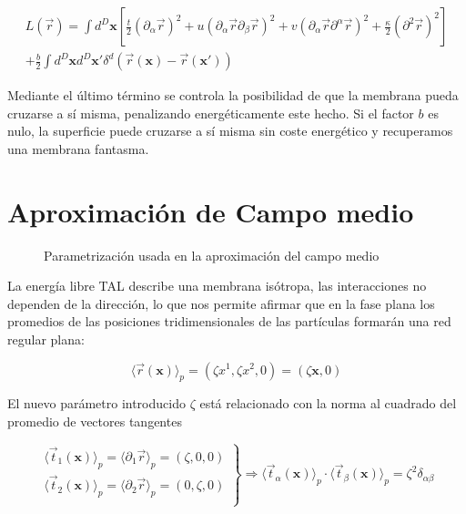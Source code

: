 \begin{multline}
L(\vec{r})=\int d^D\mathbf{x}
\left[
\frac{t}{2}(\partial_{\alpha}\vec{r})^2+
u(\partial_{\alpha}\vec{r}\partial_{\beta}\vec{r})^2+
v(\partial_{\alpha}\vec{r}\partial^{\alpha}\vec{r})^2+
\frac{\kappa}{2}(\partial^2\vec{r})^2
\right]\\
+\frac{b}{2}\int d^D\mathbf{x} d^D\mathbf{x'}
\delta^{d}(\vec{r}(\mathbf{x})-\vec{r}(\mathbf{x'}))
\end{multline}

Mediante el último término se controla la posibilidad de que la membrana pueda
cruzarse a sí misma, penalizando energéticamente este hecho. Si el factor $b$
es nulo, la superficie puede cruzarse a sí misma sin coste energético y
recuperamos una membrana fantasma.

\section{Aproximación de Campo medio}

\begin{figure}[h]
\centering
 \resizebox{\columnwidth}{!}{}
\caption{Parametrización usada en la aproximación del campo medio}
\end{figure}

La energía libre TAL  describe una membrana isótropa, las interacciones no
dependen de la dirección, lo que nos permite afirmar que en la fase
plana los promedios de las posiciones tridimensionales de las partículas
formarán una red regular plana:  

\begin{equation*}
 \langle\vec{r}(\mathbf{x})\rangle_{p}=(\zeta x^1,\zeta x^2,0)=(\zeta \mathbf{x},0) 
\end{equation*}

El nuevo parámetro introducido $\zeta$ está relacionado con la norma al
cuadrado del promedio de  vectores tangentes

\begin{equation*}
 \left.\begin{array}{c}
\langle\vec{t}_{1}(\mathbf{x})\rangle_{p}=\langle\partial_1\vec{r}\rangle_{p}=(\zeta ,0,0)\\
\langle\vec{t}_{2}(\mathbf{x})\rangle_{p}=\langle\partial_2\vec{r}\rangle_{p}=(0,\zeta ,0)\\
 \end{array}\right\}\Rightarrow
\langle\vec{t}_{\alpha}(\mathbf{x})\rangle_{p}\cdot\langle\vec{t}_{\beta}(\mathbf{x})\rangle_{p}=\zeta^2 \delta_{\alpha\beta}
\end{equation*}

